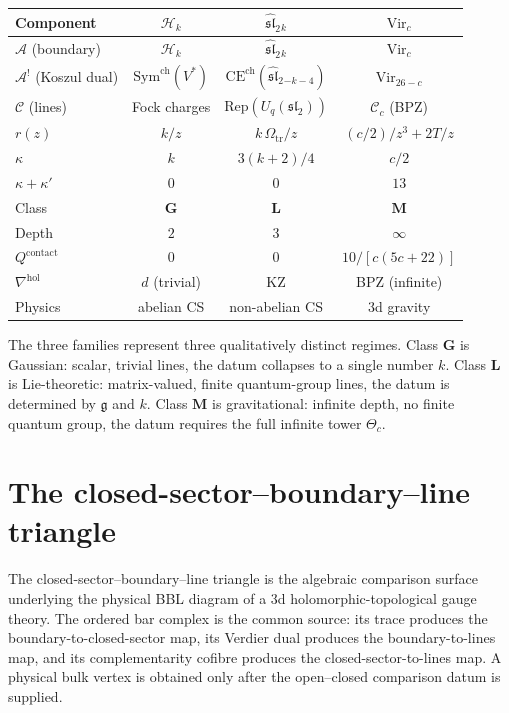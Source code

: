 \documentclass[11pt,reqno]{amsart}
\theoremstyle{definition}
\theoremstyle{remark}
\newcommand{\cA}{\mathcal{A}}
\newcommand{\cC}{\mathcal{C}}
\newcommand{\cH}{\mathcal{H}}
\newcommand{\Sym}{\mathrm{Sym}}
\newcommand{\Vir}{\mathrm{Vir}}
\newcommand{\Rep}{\mathrm{Rep}}
\newcommand{\hol}{\mathrm{hol}}
\newcommand{\fg}{\mathfrak{g}}
\newcommand{\fsl}{\mathfrak{sl}}
\numberwithin{equation}{section}
\begin{document}
\begin{center}
\renewcommand{\arraystretch}{1.3}
\begin{tabular}{@{}lccc@{}}
\toprule
Component & $\cH_k$ & $\widehat{\fsl}_2{}_k$
 & $\Vir_c$ \\
\midrule
$\cA$ (boundary)
 & $\cH_k$
 & $\widehat{\fsl}_2{}_k$
 & $\Vir_c$ \\[3pt]
$\cA^!$ (Koszul dual)
 & $\Sym^{\mathrm{ch}}(V^*)$
 & $\mathrm{CE}^{\mathrm{ch}}(\widehat{\fsl}_2{}_{-k-4})$
 & $\Vir_{26-c}$ \\[3pt]
$\cC$ (lines)
 & Fock charges
 & $\Rep(U_q(\fsl_2))$
 & $\cC_c$ (BPZ) \\[3pt]
$r(z)$
 & $k/z$
 & $k\,\Omega_{\mathrm{tr}}/z$
 & $(c/2)/z^3 + 2T/z$ \\[3pt]
$\kappa$
 & $k$
 & $3(k+2)/4$
 & $c/2$ \\[3pt]
$\kappa + \kappa'$
 & $0$
 & $0$
 & $13$ \\[3pt]
Class
 & $\mathbf{G}$
 & $\mathbf{L}$
 & $\mathbf{M}$ \\[3pt]
Depth
 & $2$ & $3$ & $\infty$ \\[3pt]
$Q^{\mathrm{contact}}$
 & $0$ & $0$
 & $10/[c(5c+22)]$ \\[3pt]
$\nabla^{\hol}$
 & $d$ (trivial) & KZ & BPZ (infinite) \\[3pt]
Physics
 & abelian CS & non-abelian CS & 3d gravity \\
\bottomrule
\end{tabular}
\end{center}

The three families represent three qualitatively distinct regimes.
Class $\mathbf{G}$ is Gaussian: scalar, trivial lines, the datum
collapses to a single number $k$. Class $\mathbf{L}$ is Lie-theoretic:
matrix-valued, finite quantum-group lines, the datum is determined by
$\fg$ and $k$. Class $\mathbf{M}$ is gravitational: infinite depth,
no finite quantum group, the datum requires the full infinite tower
$\Theta_c$.


\section{The closed-sector--boundary--line triangle}\label{sec:bbl}

The closed-sector--boundary--line triangle is the algebraic comparison
surface underlying the physical BBL diagram of a 3d
holomorphic-topological gauge theory. The ordered bar complex is the
common source: its trace produces the boundary-to-closed-sector map,
its Verdier dual produces the boundary-to-lines map, and its
complementarity cofibre produces the closed-sector-to-lines map. A
physical bulk vertex is obtained only after the open--closed comparison
datum is supplied.
\end{document}
